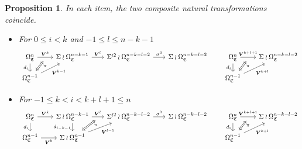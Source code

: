 \documentclass[a4paper,10pt
]{article}%
\numberwithin{equation}{section}
\numberwithin{figure}{section}
\newtheorem{proposition}[equation]{Proposition}%
\theoremstyle{definition} %
\newcommand{\1}{\ensuremath{\mathbbm 1}}%
\begin{document}
\begin{proposition}\label{CATDIAG2 PROP}
	In each item, the two composite natural transformations coincide.
	\begin{itemize}
		\item[(IT1)]
		For $0 \leq i < k $ and $-1 \leq l \leq n-k-1$
		\begin{equation}
		\begin{tikzcd}[row sep = 12pt, column sep = 18pt]
		|[alias=V]|
		\Omega_{\mathfrak{C}}^{n} \ar{r}{\boldsymbol{V}^{k}}[swap,name=UU]{} \arrow{d}[swap]{d_i}&
		\Sigma \wr \Omega_{\mathfrak{C}}^{n-k-1} \ar{r}{\boldsymbol{V}^l} &
		\Sigma^{\wr 2} \wr \Omega^{n-k-l-2}_{\mathfrak{C}} \ar{r}{\sigma^0} &
		\Sigma \wr \Omega^{n-k-l-2}_{\mathfrak{C}}
		&
		\Omega^{n}_{\mathfrak{C}} \ar{r}{\boldsymbol{V}^{k+l+1}}[swap,name=UUU]{} \arrow{d}[swap]{d_i}&
		\Sigma \wr \Omega^{n-k-l-2}_{\mathfrak{C}} &
		\\
		|[alias=VV]|
		\Omega^{n-1}_{\mathfrak{C}} \arrow{ur}[swap]{\boldsymbol{V}^{k-1}} & & &
		&
		|[alias=VVV]|
		\Omega^{n-1}_{\mathfrak{C}} \arrow{ur}[swap]{\boldsymbol{V}^{k+l}} &
		\arrow[Leftrightarrow, from=VV, to=UU,shorten >=0.05cm,shorten <=0.05cm
		,swap,near end,"\pi"
		]
		\arrow[Leftrightarrow, from=VVV, to=UUU,shorten >=0.05cm,shorten <=0.05cm
		,swap,near end,"\pi"
		]
		\end{tikzcd}
		\end{equation}
		
		\item[(IT2)]
		For $-1 \leq k < i < k + l + 1 \leq n$
		\begin{equation}
		\begin{tikzcd}[row sep = 12pt, column sep = 18pt]
		\Omega^n_{\mathfrak{C}} \ar{r}{\boldsymbol{V}^k} \ar{d}[swap]{d_i} &
		|[alias=V]|
		\Sigma \wr \Omega^{n-k-1}_{\mathfrak{C}} \ar{r}{\boldsymbol{V}^{l}}[swap,name=UU]{} \arrow{d}[swap]{d_{i-k-1}} &
		\Sigma^{\wr 2} \wr \Omega^{n-k-l-2}_{\mathfrak{C}} \ar{r}{\sigma^0} &
		\Sigma \wr \Omega^{n-k-l-2}_{\mathfrak{C}}
		&
		\Omega^{n}_{\mathfrak{C}} \ar{r}{\boldsymbol{V}^{k+l+1}}[swap,name=UUU]{} \arrow{d}[swap]{d_i}&
		\Sigma \wr \Omega^{n-k-l-2}_{\mathfrak{C}} &
		\\
		\Omega^{n-1}_{\mathfrak{C}} \ar{r}[swap]{\boldsymbol{V}^k} &
		|[alias=VV]|
		\Sigma \wr \Omega^{n-1}_{\mathfrak{C}} \arrow{ur}[swap]{\boldsymbol{V}^{l-1}} & &
		&
		|[alias=VVV]|
		\Omega^{n-1}_{\mathfrak{C}} \arrow{ur}[swap]{\boldsymbol{V}^{k+l}} &
		\arrow[Leftrightarrow, from=VV, to=UU,shorten >=0.05cm,shorten <=0.05cm
		,swap,near end,"\pi"
		]
		\arrow[Leftrightarrow, from=VVV, to=UUU,shorten >=0.05cm,shorten <=0.05cm
		,swap,near end,"\pi"
		]
		\end{tikzcd}
		\end{equation}
		

\end{itemize}
\end{proposition}
\end{document}
